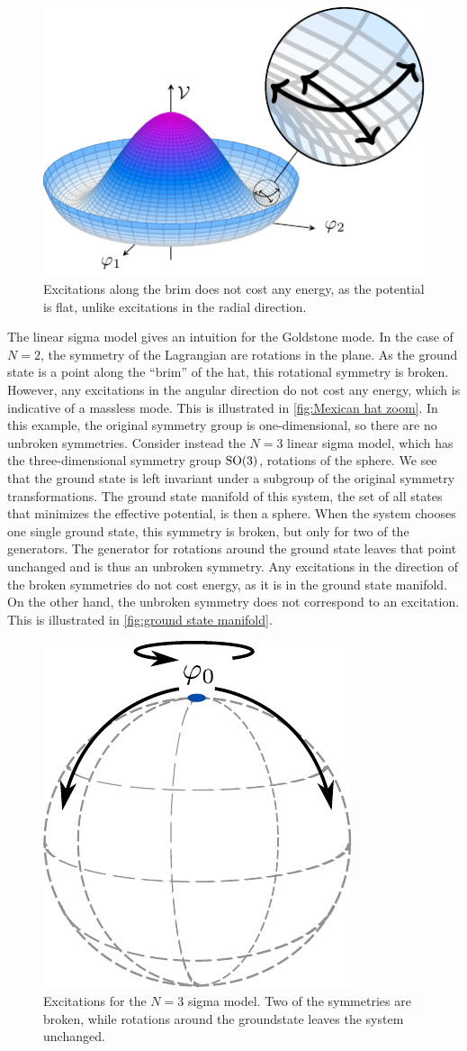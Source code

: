 \begin{figure}[ht]
    \centering
    \hspace*{2.5cm}
    \includegraphics[width=.6\linewidth]{figurer/mexican_hat_zoom.pdf}
    \caption{Excitations along the brim does not cost any energy, as the potential is flat, unlike excitations in the radial direction.}
    \label{fig:Mexican hat zoom}
\end{figure}

The linear sigma model gives an intuition for the Goldstone mode.
In the case of $N = 2$, the symmetry of the Lagrangian are rotations in the plane.
As the ground state is a point along the ``brim'' of the hat, this rotational symmetry is broken.
However, any excitations in the angular direction do not cost any energy, which is indicative of a massless mode.
This is illustrated in \autoref{fig:Mexican hat zoom}.
In this example, the original symmetry group is one-dimensional, so there are no unbroken symmetries.
Consider instead the $N=3$ linear sigma model, which has the three-dimensional symmetry group $\text{SO}(3)$, rotations of the sphere.
We see that the ground state is left invariant under a subgroup of the original symmetry transformations.
The ground state manifold of this system, the set of all states that minimizes the effective potential, is then a sphere.
When the system chooses one single ground state, this symmetry is broken, but only for two of the generators. 
The generator for rotations around the ground state leaves that point unchanged and is thus an unbroken symmetry.
Any excitations in the direction of the broken symmetries do not cost energy, as it is in the ground state manifold.
On the other hand, the unbroken symmetry does not correspond to an excitation.
This is illustrated in \autoref{fig:ground state manifold}.

\begin{figure}[h]
    \centering
    \includegraphics[width=.35\linewidth]{figurer/SU(3).pdf}
    \caption{Excitations for the $N=3$ sigma model. Two of the symmetries are broken, while rotations around the groundstate leaves the system unchanged.}
    \label{fig:ground state manifold}
\end{figure}
